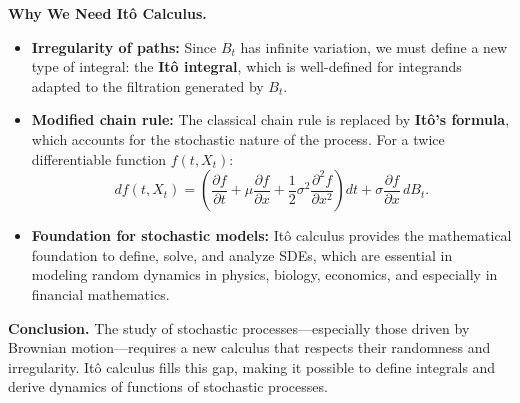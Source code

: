 \vspace{1em}
\textbf{Why We Need Itô Calculus.}
\begin{itemize}
  \item \textbf{Irregularity of paths:} Since \( B_t \) has infinite variation, we must define a new type of integral: the \textbf{Itô integral}, which is well-defined for integrands adapted to the filtration generated by \( B_t \).
  \item \textbf{Modified chain rule:} The classical chain rule is replaced by \textbf{Itô’s formula}, which accounts for the stochastic nature of the process. For a twice differentiable function \( f(t, X_t) \):
  \[
  df(t, X_t) = \left( \frac{\partial f}{\partial t} + \mu \frac{\partial f}{\partial x} + \frac{1}{2} \sigma^2 \frac{\partial^2 f}{\partial x^2} \right) dt + \sigma \frac{\partial f}{\partial x} \, dB_t.
  \]
  \item \textbf{Foundation for stochastic models:} Itô calculus provides the mathematical foundation to define, solve, and analyze SDEs, which are essential in modeling random dynamics in physics, biology, economics, and especially in financial mathematics.
\end{itemize}

\textbf{Conclusion.}  
The study of stochastic processes—especially those driven by Brownian motion—requires a new calculus that respects their randomness and irregularity. Itô calculus fills this gap, making it possible to define integrals and derive dynamics of functions of stochastic processes.